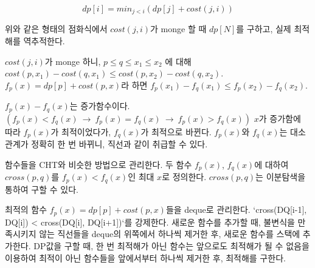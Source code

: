 $$dp[i] = min_{j<i} (dp[j] + cost(j, i))$$

위와 같은 형태의 점화식에서 $cost(j, i)$가 monge 할 때 $dp[N]$를 구하고, 실제 최적해를 역추적한다.

$cost(j, i)$가 monge 하니, $p \le q \le x_1 \le x_2$ 에 대해 $cost(p, x_1)-cost(q, x_1) \le cost(p, x_2)-cost(q, x_2)$.  
$f_p(x) = dp[p] + cost(p, x)$라 하면 $f_p(x_1)-f_q(x_1) \le f_p(x_2)-f_q(x_2)$.

$f_p(x)-f_q(x)$는 증가함수이다. $(f_p(x)<f_q(x) \ \rightarrow \ f_p(x)=f_q(x) \ \rightarrow \ f_p(x)>f_q(x))$  
$x$가 증가함에 따라 $f_p(x)$가 최적이었다가, $f_q(x)$가 최적으로 바뀐다.  
$f_p(x)$와 $f_q(x)$는 대소관계가 정확히 한 번 바뀌니, 직선과 같이 취급할 수 있다.

함수들을 CHT와 비슷한 방법으로 관리한다.
두 함수 $f_p(x)$, $f_q(x)$에 대하여 $cross(p, q)$를 $f_p(x)<f_q(x)$인 최대 $x$로 정의한다.
$cross(p, q)$는 이분탐색을 통하여 구할 수 있다.

최적의 함수 $f_p(x) = dp[p] + cost(p, x)$들을 deque로 관리한다.
`cross(DQ[i-1], DQ[i]) < cross(DQ[i], DQ[i+1])`를 강제한다.
새로운 함수를 추가할 때, 불변식을 만족시키지 않는 직선들을 deque의 위쪽에서 하나씩 제거한 후, 새로운 함수를 스택에 추가한다.
DP값을 구할 때, 한 번 최적해가 아닌 함수는 앞으로도 최적해가 될 수 없음을 이용하여 최적이 아닌 함수들을 앞에서부터 하나씩 제거한 후, 최적해를 구한다.